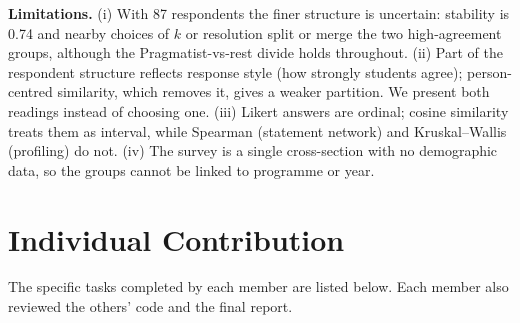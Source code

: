 \documentclass[11pt,a4paper]{article}
\begin{document}
\textbf{Limitations.} (i) With 87 respondents the finer structure is uncertain: stability is 0.74 and nearby
choices of $k$ or resolution split or merge the two high-agreement groups, although the Pragmatist-vs-rest divide holds throughout.
(ii) Part of the respondent structure reflects response style (how strongly students agree); person-centred similarity, which removes
it, gives a weaker partition. We present both readings instead of choosing one. (iii) Likert answers are ordinal; cosine
similarity treats them as interval, while Spearman (statement network) and Kruskal--Wallis (profiling) do not.
(iv) The survey is a single cross-section with no demographic data, so the groups cannot be linked to programme or year.

\section{Individual Contribution}
The specific tasks completed by each member are listed below. Each member also reviewed the others' code and the final report.
\end{document}
